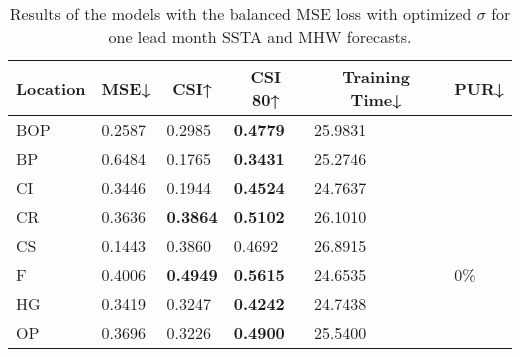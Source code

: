 \documentclass[11pt, a4paper]{article}
\begin{document}
\begin{table}[H]
\centering
\small
\caption{Results of the models with the balanced MSE loss with optimized $\sigma$ for one lead month SSTA and MHW forecasts.}\label{tb:bmse}
\begin{tabular}{llllll}
\multicolumn{1}{c}{\textbf{Location}} & \multicolumn{1}{c}{\textbf{MSE↓}} & \multicolumn{1}{c}{\textbf{CSI↑}} & \multicolumn{1}{c}{\textbf{CSI 80↑}} & \multicolumn{1}{c}{\textbf{Training Time↓}} & \multicolumn{1}{c}{\textbf{PUR↓}} \\ \hline
BOP                         & 0.2587                            & 0.2985                            & \textbf{0.4779}                      & 25.9831                                     &                                   \\
BP                        & 0.6484                            & 0.1765                            & \textbf{0.3431}                      & 25.2746                                     &                                   \\
CI                        & 0.3446                            & 0.1944                            & \textbf{0.4524}                      & 24.7637                                     &                                   \\
CR                           & 0.3636                            & \textbf{0.3864}                   & \textbf{0.5102}                      & 26.1010                                     &                                   \\
CS                           & 0.1443                            & 0.3860                            & 0.4692                               & 26.8915                                     &                                   \\
F                             & 0.4006                            & \textbf{0.4949}                   & \textbf{0.5615}                      & 24.6535                                     & 0\%                               \\
HG                          & 0.3419                            & 0.3247                            & \textbf{0.4242}                      & 24.7438                                     &                                   \\
OP                       & 0.3696                            & 0.3226                            & \textbf{0.4900}                      & 25.5400                                     &                                   \\

\end{tabular}
\end{table}
\end{document}
